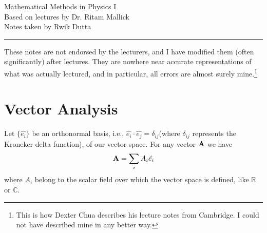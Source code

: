 \documentclass[10pt, a4paper]{extarticle}
\theoremstyle{definition}
\begin{document}
\begin{center}
	\fontsize{25}{60}\selectfont Mathematical Methods in Physics I \\
	\large Based on lectures by Dr. Ritam Mallick\\
	Notes taken by Rwik Dutta
\end{center}
\hrule
\begin{center}
	These notes are not endorsed by the lecturers, and I have modified them (often
	significantly) after lectures. They are nowhere near accurate representations of what
	was actually lectured, and in particular, all errors are almost surely mine.\footnote[1]{This is how Dexter Chua describes his lecture notes from Cambridge. I could not have described mine in any better way.}
\end{center}
\tableofcontents

\newpage

\section{Vector Analysis}
Let $\{\hat{e_i}\}$ be an orthonormal basis, i.e., $\hat{e_i}\cdot\hat{e_j}=\delta_{ij}$(where $\delta_{ij}$ represents the Kroneker delta function), of our vector space. For any vector $\vb{A}$ we have
\[\vb{A}=\sum_{i}A_i\hat{e_i}\]
where $A_i$ belong to the scalar field over which the vector space is defined, like $\mathbb{R}$ or $\mathbb{C}$.
\end{document}
